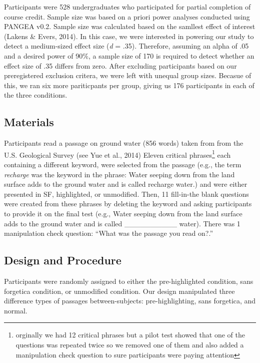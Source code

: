 \documentclass[english,doc]{apa6}
\begin{document}
Participants were 528 undergraduates who participated for partial completion of course credit. Sample size was based on a priori power analyses conducted using PANGEA v0.2. Sample size was calculated based on the samllest effect of interest (Lakens \& Evers, 2014). In this case, we were interested in powering our study to detect a medium-sized effect size (\emph{d} = .35). Therefore, assuming an alpha of .05 and a desired power of 90\%, a sample size of 170 is required to detect whether an effect size of .35 differs from zero. After excluding participants based on our preregistered exclusion critera, we were left with unequal group sizes. Becasue of this, we ran six more pariticpants per group, giving us 176 participants in each of the three conditions.

\hypertarget{materials-1}{%
\subsection{Materials}\label{materials-1}}

Participants read a passage on ground water (856 words) taken from from the U.S. Geological Survey (see Yue et al., 2014) Eleven critical phrases\footnote{orginally we had 12 critical phrases but a pilot test showed that one of the questions was repeated twice so we removed one of them and also added a manipulation check question to sure participants were paying attention} each containing a different keyword, were selected from the passage (e.g., the term \emph{recharge} was the keyword in the phrase: Water seeping down from the land surface adds to the ground water and is called recharge water.) and were either presented in SF, highlighted, or unmodified. Then, 11 fill-in-the blank questions were created from these phrases by deleting the keyword and asking participants to provide it on the final test (e.g., Water seeping down from the land surface adds to the ground water and is called \_\_\_\_\_\_\_\_\_\_ water). There was 1 manipulation check question: \enquote{What was the passage you read on?.}

\hypertarget{design-and-procedure-1}{%
\subsection{Design and Procedure}\label{design-and-procedure-1}}

Participants were randomly assigned to either the pre-highlighted condition, sans forgetica condition, or unmodified condition. Our design manipulated three difference types of passages between-subjects: pre-highlighting, sans forgetica, and normal.
\end{document}

